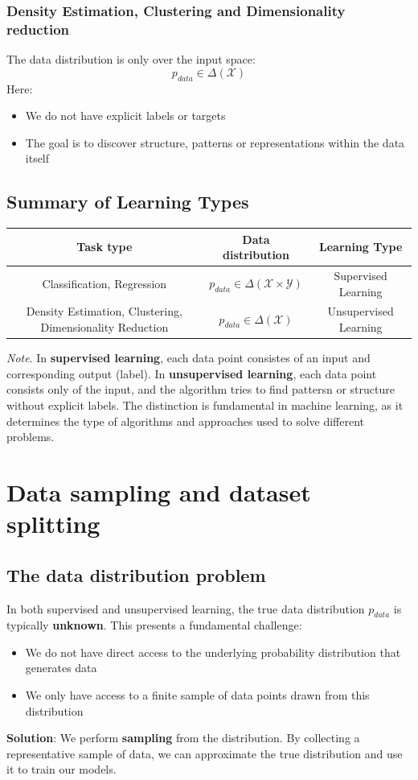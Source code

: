 \documentclass[a4paper]{article}
\theoremstyle{definition}
\begin{document}
\subsubsection{Density Estimation, Clustering and Dimensionality reduction}
The data distribution is only over the input space:
\[
  p_{data} \in \Delta(\mathcal{X})
\]
Here:
\begin{itemize}
    \item We do not have explicit labels or targets 
    \item The goal is to discover structure, patterns or representations within the data itself
\end{itemize}
\subsection{Summary of Learning Types}
\begin{center}
    \begin{tabular}{ |c|c|c| }
        \hline 
        \textbf{Task type} & \textbf{Data distribution} & \textbf{Learning Type} \\
        \hline 
        Classification, Regression & \( p_{data} \in \Delta(\mathcal{X} \times \mathcal{Y}) \) & Supervised Learning \\
        \hline
        Density Estimation, Clustering, Dimensionality Reduction & \( p_{data} \in \Delta(\mathcal{X}) \) & Unsupervised Learning \\
        \hline
    \end{tabular}
\end{center}
\textit{Note}. In \textbf{supervised learning}, each data point consistes of an input and corresponding 
output (label). In \textbf{unsupervised learning}, each data point consists only of the input, and the algorithm 
tries to find pattersn or structure without explicit labels.
\vspace{1em}
\noindent
\newline
The distinction is fundamental in machine learning, as it determines the type of 
algorithms and approaches used to solve different problems.
\section{Data sampling and dataset splitting}
\subsection{The data distribution problem}
In both supervised and unsupervised learning, the true data distribution \( p_{data} \) is typically \textbf{unknown}. This presents a fundamental 
challenge:
\begin{itemize}
    \item We do not have direct access to the underlying probability distribution that generates data 
    \item We only have access to a finite sample of data points drawn from this distribution
\end{itemize}
\textbf{Solution}: We perform \textbf{sampling} from the distribution. By collecting a representative sample of data, we can approximate the true 
distribution and use it to train our models.
\end{document}

